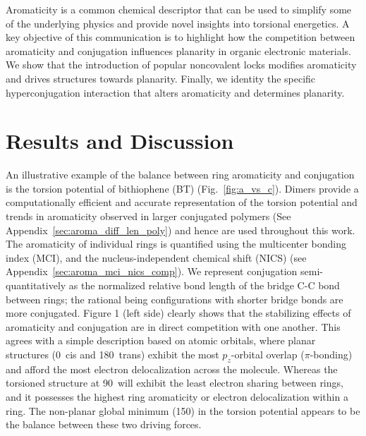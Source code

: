 Aromaticity is a common chemical descriptor that can be used to simplify some of the underlying physics and provide novel insights into torsional energetics. A key objective of this communication is to highlight how the competition between aromaticity and conjugation\cite{Hernandez1994, Kertesz2005, Huang2017} influences planarity in organic electronic materials. We show that the introduction of popular noncovalent locks modifies aromaticity and drives structures towards planarity. Finally, we identity the specific hyperconjugation interaction that alters aromaticity and determines planarity.

\section{Results and Discussion}

An illustrative example of the balance between ring aromaticity and conjugation is the torsion potential of bithiophene (BT) (Fig.~\ref{fig:a_vs_c}). Dimers provide a computationally efficient and accurate representation of the torsion potential and trends in aromaticity observed in larger conjugated polymers (See Appendix~\ref{sec:aroma_diff_len_poly})\cite{Dubay2012} and hence are used throughout this work. The aromaticity of individual rings is quantified using the multicenter bonding index (MCI),\cite{Giambiagi1990, Giambiagi2000} and the nucleus-independent chemical shift (NICS)\cite{Fallah-Bagher-Shaidaei2006, Chen2005} (see Appendix~\ref{sec:aroma_mci_nics_comp}). We represent conjugation semi-quantitatively as the normalized relative bond length of the bridge C-C bond between rings; the rational being configurations with shorter bridge bonds are more conjugated.\cite{Daudey1980, Fernandez2006} Figure 1 (left side) clearly shows that the stabilizing effects of aromaticity and conjugation are in direct competition with one another. This agrees with a simple description based on atomic orbitals, where planar structures (0\textdegree \ cis and 180\textdegree \ trans) exhibit the most $p_z$-orbital overlap ($\pi$-bonding) and afford the most electron delocalization across the molecule. Whereas the torsioned structure at 90\textdegree \ will exhibit the least electron sharing between rings, and it possesses the highest ring aromaticity or electron delocalization within a ring. The non-planar global minimum (150\textdegree) in the torsion potential appears to be the balance between these two driving forces.


